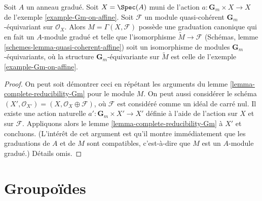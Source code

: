 \begin{lemma}
\label{lemma-Gm-equivariant-module}
Soit $A$ un anneau gradué. Soit $X = \Spec(A)$ muni de l'action
$a : \mathbf{G}_m \times X \to X$ de l'exemple \ref{example-Gm-on-affine}.
Soit $\mathcal{F}$ un module quasi-cohérent $\mathbf{G}_m$-équivariant
sur $\mathcal{O}_X$. Alors $M = \Gamma(X, \mathcal{F})$
possède une graduation canonique qui en fait un $A$-module gradué
et telle que l'isomorphisme $\widetilde{M} \to \mathcal{F}$
(Schémas, lemme \ref{schemes-lemma-quasi-coherent-affine})
soit un isomorphisme de modules $\mathbf{G}_m$-équivariants, où
la structure $\mathbf{G}_m$-équivariante sur $\widetilde{M}$
est celle de l'exemple \ref{example-Gm-on-affine}.
\end{lemma}

\begin{proof}
On peut soit démontrer ceci en répétant les arguments du
lemme \ref{lemma-complete-reducibility-Gm} pour le module $M$.
On peut aussi considérer le schéma
$(X', \mathcal{O}_{X'}) = (X, \mathcal{O}_X \oplus \mathcal{F})$,
où $\mathcal{F}$ est considéré comme un idéal de carré nul.
Il existe une action naturelle $a' : \mathbf{G}_m \times X' \to X'$
définie à l'aide de l'action sur $X$ et sur $\mathcal{F}$. Appliquons alors
le lemme \ref{lemma-complete-reducibility-Gm} à $X'$ et concluons.
(L'intérêt de cet argument est qu'il montre immédiatement
que les graduations de $A$ et de $M$ sont compatibles, c'est-à-dire que $M$
est un $A$-module gradué.)
Détails omis.
\end{proof}



\section{Groupoïdes}
\label{section-groupoids}

